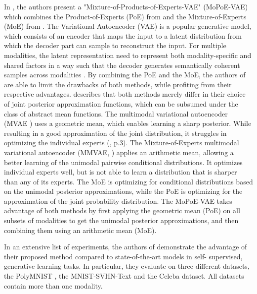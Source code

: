 	In \cite{thomas_gener-ELBO}, the authors present a "Mixture-of-Products-of-Experts-VAE" (MoPoE-VAE) which combines the Product-of-Experts (PoE) from \cite{wu2018multimodal} and the Mixture-of-Experts (MoE) from \cite{shi2019variational}.
	The Variational Autoencoder (VAE) \cite{doersch2016tutorial} is a popular generative model, which consists of an encoder that maps the input to a latent distribution from which the decoder part can sample to reconstruct the input.
	For multiple modalities, the latent representation need to represent both modality-specific and shared factors in a way such that the decoder generates semantically coherent samples across modalities \cite{shi2019variational}.
	By combining the PoE and the MoE, the authors of \cite{thomas_gener-ELBO} are able to limit the drawbacks of both methods, while profiting from their respective advantages.
	\cite{thomas_gener-ELBO} describes that both methods merely differ in their choice of joint posterior approximation functions, which can be subsumed under the class of abstract mean functions.
	The multimodal variational autoencoder (MVAE \cite{wu2018multimodal}) uses a geometric mean, which enables learning a sharp posterior.
	While resulting in a good approximation of the joint distribution, it struggles in optimizing the individual experts (\cite{wu2018multimodal}, p.3).
	The Mixture-of-Experts multimodal variational autoencoder (MMVAE, \cite{shi2019variational}) applies an arithmetic mean, allowing a better learning of the unimodal pairwise conditional distributions.
	It optimizes individual experts well, but is not able to learn a distribution that is sharper than any of its experts.
	The MoE is optimizing for conditional distributions based on the unimodal posterior approximations, while the PoE is optimizing for the approximation of the joint probability distribution.
	The MoPoE-VAE takes advantage of both methods by first applying the geometric mean (PoE) on all subsets of modalities to get the unimodal posterior approximations, and then combining them using an arithmetic mean (MoE).

	In an extensive list of experiments, the authors of \cite{thomas_gener-ELBO} demonstrate the advantage of their proposed method compared to state-of-the-art models in self- supervised, generative learning tasks.
	In particular, they evaluate on three different datasets, the PolyMNIST \cite{thomas_gener-ELBO}, the MNIST-SVHN-Text \cite{thomas_multimodal} and the Celeba dataset.
	All datasets contain more than one modality.




